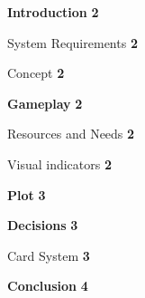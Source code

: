
\setlength{\parindent}{0.5cm}


\textbf{Introduction} \hfill \textbf{2}

\setlength{\parindent}{0.1cm}

        System Requirements \hfill \textbf{2}

        Concept \hfill \textbf{2}

\setlength{\parindent}{0.5cm}
   
\textbf{Gameplay} \hfill \textbf{2}

\setlength{\parindent}{0.1cm}

        Resources and Needs \hfill \textbf{2}

        Visual indicators \hfill  \textbf{2}

\setlength{\parindent}{0.5cm}
   
\textbf{Plot} \hfill \textbf{3}

\setlength{\parindent}{0.1cm}

\setlength{\parindent}{0.5cm}
   
\textbf{Decisions} \hfill \textbf{3}

\setlength{\parindent}{0.1cm}

        Card System \hfill  \textbf{3}

        

\setlength{\parindent}{0.5cm}
   
\textbf{Conclusion} \hfill \textbf{4}

\setlength{\parindent}{0.1cm}




